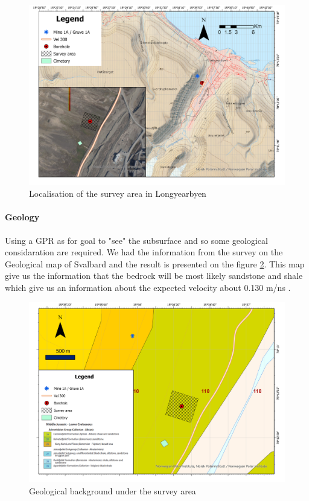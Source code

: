 \begin{figure}
    \centering
    \includegraphics[width=\linewidth]{Images/00_Methodology/GeographicSituation.jpg}
    \caption{Localisation of the survey area in Longyearbyen}
    \label{fig:Location}
\end{figure}


\paragraph{Geology} Using a GPR as for goal to "see" the subsurface and so some geological considaration are required. We had the information from the survey on the Geological map of Svalbard \cite{Atakan2015GeoscienceSvalbard} and the result is presented on the figure \ref{fig:GeologicalBackground}. This map give us the information that the bedrock will be most likely sandstone and shale which give us an information about the expected velocity about 0.130 m/ns \cite{GPRAnalysis}.

\begin{figure}
    \centering
    \includegraphics[width=\linewidth]{Images/00_Methodology/GeologicalSituationMap.jpg}
    \caption{Geological background under the survey area \cite{Atakan2015GeoscienceSvalbard}}
    \label{fig:GeologicalBackground}
\end{figure}

